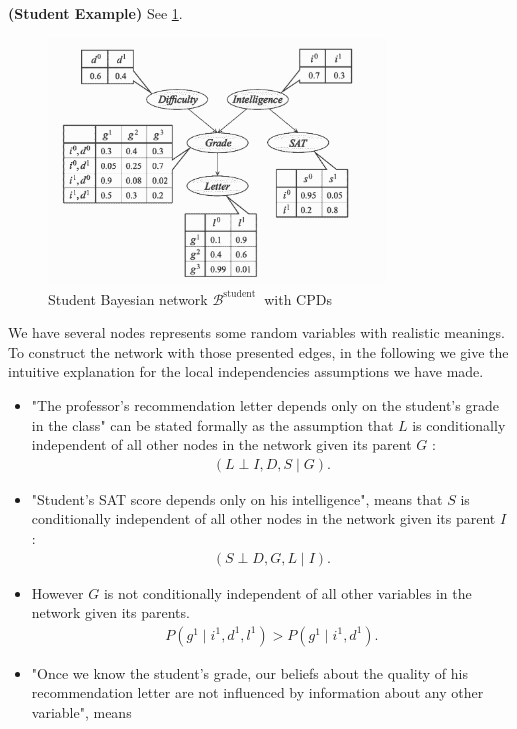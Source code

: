 \documentclass{article}
\newcommand{\bfs}[1]{\textbf{({#1}) }}
\begin{document}
\begin{exma}\bfs{Student Example} See \cref{fig:Student}.
\begin{figure}
    \centering
    \includegraphics[width=0.8\textwidth]{Figs/a5.png}
    \caption{Student Bayesian network $\mathcal{B}^{\text {student }}$ with CPDs}
    \label{fig:Student}
\end{figure}
We have several nodes represents some  random variables with realistic meanings.
 To construct the network with those presented edges, in the following we give the intuitive explanation for the local independencies assumptions we have made.
\begin{itemize}
    \item "The professor's recommendation letter depends only on the student's grade in the class" can be stated formally as the assumption that $L$ is conditionally independent of all other nodes in the network given its parent $G$ :
\begin{align*}
(L \perp I, D, S \mid G) .
\end{align*}
\item  "Student's SAT score depends only on his intelligence", means that $S$ is conditionally independent of all other nodes in the network given its parent $I$ :
\begin{align*}
(S \perp D, G, L \mid I) .
\end{align*}
\item However $G$ is not conditionally independent of all other variables in the network given its parents.
\begin{align*}
P\left(g^{1} \mid i^{1}, d^{1}, l^{1}\right)>P\left(g^{1} \mid i^{1}, d^{1}\right) .
\end{align*}
\item "Once we know the student's grade, our beliefs about the quality of his recommendation letter are not influenced by information about any other variable", means

\end{itemize}
\end{exma}
\end{document}
